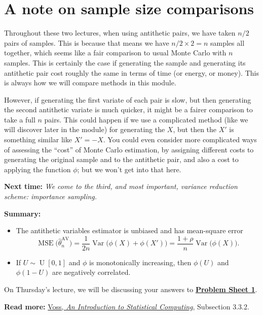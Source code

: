 \documentclass[
  letterpaper,
  DIV=11,
  numbers=noendperiod]{scrreprt}
\newcommand{\Var}{\operatorname{Var}}
\theoremstyle{plain}
\theoremstyle{definition}
\theoremstyle{definition}
\theoremstyle{remark}
\begin{document}
\section{A note on sample size
comparisons}\label{a-note-on-sample-size-comparisons}

Throughout these two lectures, when using antithetic pairs, we have
taken \(n/2\) pairs of samples. This is because that means we have
\(n/2 \times 2 = n\) samples all together, which seems like a fair
comparison to usual Monte Carlo with \(n\) samples. This is certainly
the case if generating the sample and generating its antithetic pair
cost roughly the same in terms of time (or energy, or money). This is
always how we will compare methods in this module.

However, if generating the first variate of each pair is slow, but then
generating the second antithetic variate is much quicker, it might be a
fairer comparison to take a full \(n\) pairs. This could happen if we
use a complicated method (like we will discover later in the module) for
generating the \(X\), but then the \(X'\) is something similar like
\(X' = -X\). You could even consider more complicated ways of assessing
the ``cost'' of Monte Carlo estimation, by assigning different costs to
generating the original sample and to the antithetic pair, and also a
cost to applying the function \(\phi\); but we won't get into that here.

\textbf{Next time:} \emph{We come to the third, and most important,
variance reduction scheme: importance sampling.}

\textbf{Summary:}

\begin{itemize}
\item
  The antithetic variables estimator is unbiased and has mean-square
  error
  \[ \operatorname{MSE}\big(\widehat{\theta}_n^{\mathrm{AV}}\big) = \frac{1}{2n} \operatorname{Var}\big(\phi(X) + \phi(X')\big) = \frac{1+\rho}{n}\Var\big(\phi(X)\big). \]
\item
  If \(U \sim \operatorname{U}[0, 1]\) and \(\phi\) is monotonically
  increasing, then \(\phi(U)\) and \(\phi(1-U)\) are negatively
  correlated.
\end{itemize}

On Thursday's lecture, we will be discussing your answers to
\hyperref[P1]{\textbf{Problem Sheet 1}}.

\textbf{Read more:}
\href{https://leeds.primo.exlibrisgroup.com/permalink/44LEE_INST/1fj430b/cdi_askewsholts_vlebooks_9781118728031}{Voss,
\emph{An Introduction to Statistical Computing}}, Subsection 3.3.2.
\end{document}

